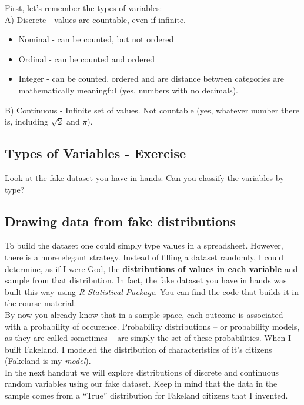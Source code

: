 \documentclass[11pt]{article}
\begin{document}
	First, let's remember the types of variables:\\
	
	A) Discrete - values are countable, even if infinite.
	
	\begin{itemize}
		\item Nominal - can be counted, but not ordered
		\item Ordinal - can be counted and ordered
		\item Integer - can be counted, ordered and are distance between categories are mathematically meaningful (yes, numbers with no decimals).
	\end{itemize}
	
	B) Continuous - Infinite set of values. Not countable (yes, whatever number there is, including $\sqrt{2} $ and $\pi$).\\

	\subsection*{Types of Variables - Exercise}

	Look at the fake dataset you have in hands. Can you classify the variables by type?

	\subsection*{Drawing data from fake distributions}
	
	To build the dataset one could simply type values in a spreadsheet. However, there is a more elegant strategy. Instead of filling a dataset randomly, I could determine, as if I were God, the \textbf{distributions of values in each variable} and sample from that distribution. In fact, the fake dataset you have in hands was built this way using \emph{R Statistical Package}. You can find the code that builds it in the course material.\\

By now you already know that in a sample space, each outcome is associated with a probability of occurence. Probability distributions -- or probability models, as they are called sometimes -- are simply the set of these probabilities. When	I built Fakeland, I modeled the distribution of characteristics of it's citizens (Fakeland is my\emph{ model}).\\

	In the next handout we will explore distributions of discrete and continuous random variables using our fake dataset. Keep in mind that the data in the sample comes from a ``True'' distribution for Fakeland citizens that I invented.
	
\end{document}
